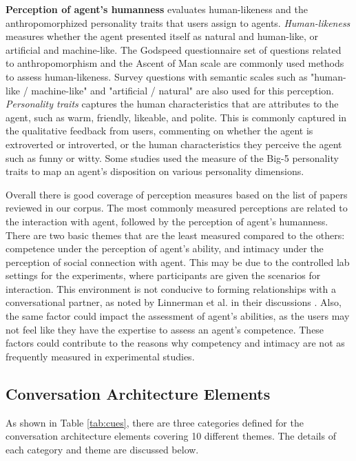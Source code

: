 \documentclass[sigconf,screen,review, anonymous]{acmart}
\newcommand{\cmt}[1]{}%
\begin{document}
\textbf{Perception of agent's humanness} evaluates human-likeness and the anthropomorphized personality traits that users assign to agents. \textit{Human-likeness} measures whether the agent presented itself as natural and human-like, or artificial and machine-like. The Godspeed questionnaire \cite{bartneck2009measurement}\cmt{godspeed} set of questions related to anthropomorphism and the Ascent of Man scale \cite{kteily2015ascent} are commonly used methods to assess human-likeness. Survey questions with semantic scales such as "human-like / machine-like" and "artificial / natural" are also used for this perception. \textit{Personality traits} captures the human characteristics that are attributes to the agent, such as warm, friendly, likeable, and polite. This is commonly captured in the qualitative feedback from users, commenting on whether the agent is extroverted or introverted, or the human characteristics they perceive the agent such as funny or witty. Some studies used the measure of the Big-5 personality traits \cite{gosling2003very} to map an agent's disposition on various personality dimensions.

Overall there is good coverage of perception measures based on the list of papers reviewed in our corpus. The most commonly measured perceptions are related to the interaction with agent, followed by the perception of agent's humanness. There are two basic themes that are the least measured compared to the others: competence under the perception of agent's ability, and intimacy under the perception of social connection with agent. This may be due to the controlled lab settings for the experiments, where participants are given the scenarios for interaction. This environment is not conducive to forming relationships with a conversational partner, as noted by Linnerman et al. in their discussions \cite{linnemann2018can}\cmt{[15]}. Also, the same factor could impact the assessment of agent's abilities, as the users may not feel like they have the expertise to assess an agent's competence. These factors could contribute to the reasons why competency and intimacy are not as frequently measured in experimental studies.


\subsection{Conversation Architecture Elements}

As shown in Table \ref{tab:cues}, there are three categories defined for the conversation architecture elements covering 10 different themes. The details of each category and theme are discussed below.
\end{document}
